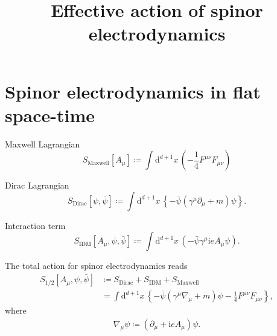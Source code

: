 \documentclass[12pt]{article}
\newcommand\mi{\mathrm{i}} %
\newcommand\dif{\mathrm{d}}
\newcommand{\rbr}[1]{{\left(#1\right)}}
\newcommand{\cbr}[1]{{\left\{#1\right\}}}
\newcommand{\sfun}[2]{{#1}\mathopen{}\left[#2\right]\mathclose{}}
\begin{document}
\title{Effective action of spinor electrodynamics} 


\date{}







\maketitle

%



\section{Spinor electrodynamics in flat space-time}

Maxwell Lagrangian
\begin{equation}
\sfun{S_\text{Maxwell}}{A_\mu} \coloneqq \int\dif^{d+1} x\,\rbr{
-\frac{1}{4} F^{\mu\nu} F_{\mu\nu} }
\end{equation}

Dirac Lagrangian \citep[sec.~11]{weinberg1995}
\begin{equation}
\sfun{S_\text{Dirac}}{\psi, \bar\psi} \coloneqq \int\dif^{d+1} x\,
\cbr{-\bar{\psi} \rbr{\gamma^\mu\partial_\mu + m}\psi}.
\end{equation}

Interaction term
\begin{equation}
\sfun{S_\text{IDM}}{A_\mu, \psi, \bar\psi} \coloneqq \int\dif^{d+1} 
x\,\rbr{-\bar{\psi}\gamma^\mu\mi e A_\mu\psi}.
\end{equation}

The total action for spinor electrodynamics reads
\begin{align}
\sfun{S_{1/2}}{A_\mu, \psi, \bar\psi} &\coloneqq 
S_\text{Dirac} + S_\text{IDM}+S_\text{Maxwell} \nonumber \\
&= \int\dif^{d+1}x\,\cbr{-\bar\psi\rbr{\gamma^\mu \nabla_\mu+m}\psi
-\frac{1}{4}F^{\mu\nu}F_{\mu\nu}},
\end{align}
where
\begin{align}
\nabla_\mu\psi \coloneqq \rbr{\partial_\mu+\mi e A_\mu}\psi.
\end{align}
\end{document}
